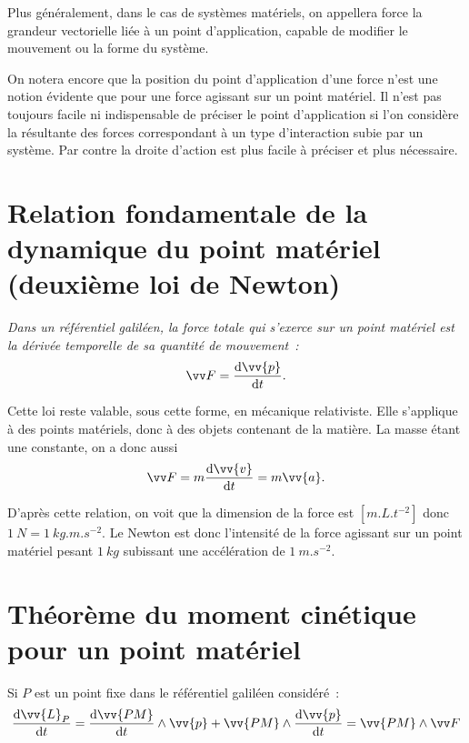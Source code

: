 Plus généralement, dans le cas de systèmes matériels, on appellera force la grandeur vectorielle liée à un point d'application, capable de modifier le mouvement ou la forme du système.

On notera encore que la position du point d'application d'une force n'est une notion évidente que pour une force agissant sur un point matériel. Il n'est pas toujours facile ni indispensable de préciser le point d'application si l'on considère la résultante des forces correspondant à un type d'interaction subie par un système. Par contre la droite d'action est plus facile à préciser et plus nécessaire.

\section{Relation fondamentale de la dynamique du point matériel (deuxième loi de Newton)}
\label{chap2-sec:relationfondamentaledeladynamique}

\emph{Dans un référentiel galiléen, la force totale qui s'exerce sur un point matériel est la dérivée temporelle de sa quantité de mouvement~:
  \begin{equation}
    \vF = \derived{\vv{p}}{t}.
  \end{equation}
}

Cette loi reste valable, sous cette forme, en mécanique relativiste. Elle s'applique à des points matériels, donc à des objets contenant de la matière. La masse étant une constante, on a donc aussi
\begin{equation}
  \vF = m \derived{\vv{v}}{t}=m\vv{a}.
\end{equation}

D'après cette relation, on voit que la dimension de la force est $[m.L.t^{-2}]$ donc $\SI{1}{N}=\SI{1}{kg.m.s^{-2}}$. Le Newton est donc l'intensité de la force agissant sur un point matériel pesant $\SI{1}{kg}$ subissant une accélération de $\SI{1}{m.s^{-2}}$.

\section{Théorème du moment cinétique pour un point matériel}
\label{chap2-sec:theoremedumomentcinetique}

Si $P$ est un point fixe dans le référentiel galiléen considéré~:
\begin{equation}
  \derived{\vv{L}_P}{t} = \derived{\vv{PM}}{t} \wedge \vv{p} +\vv{PM} \wedge  \derived{\vv{p}}{t} = \vv{PM} \wedge \vF
\end{equation}

